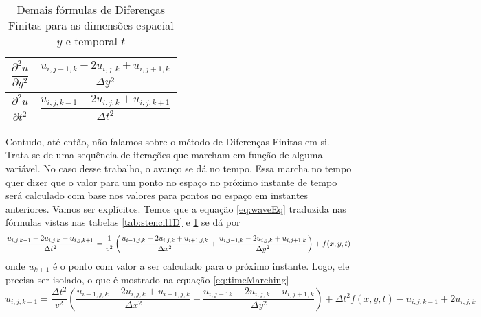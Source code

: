 	\begin{table}[H]
		\centering
		\caption{Demais fórmulas de Diferenças Finitas para as dimensões
			espacial $y$ e temporal $t$}
		\begin{tabular}{c|c}
			\hline
			$\dfrac{\partial^2 u}{\partial y^2}$ & $\dfrac{u_{i,j-1,k} - 2u_{i,j,k} + 
				u_{i,j+1,k}}{\Delta y^2}$ \\ \hline
			$\dfrac{\partial^2 u}{\partial t^2}$ & $\dfrac{u_{i,j,k-1} - 2u_{i,j,k} + 
				u_{i,j,k+1}}{\Delta t^2}$ \\ \hline
		\end{tabular}
		\label{tab:stencils3D}
	\end{table}
	
	
	Contudo, até então, não falamos sobre o método de Diferenças Finitas 
	em si. Trata-se de uma sequência de iterações que marcham em função de
	alguma variável. No caso desse trabalho, o avanço se dá no tempo. Essa marcha no tempo quer dizer que o valor para um ponto no espaço no próximo instante de tempo será calculado com base nos valores para pontos no espaço em instantes anteriores. Vamos ser explícitos. Temos que a equação \ref{eq:waveEq} traduzida nas fórmulas vistas nas tabelas 
	\ref{tab:stencil1D} e \ref{tab:stencils3D} se dá por
	\begin{equation}
		 \dfrac{u_{i,j,k-1} - 2u_{i,j,k} + u_{i,j,k+1}}{\Delta t^2} = \dfrac{1}{v^2}
			 \left(\dfrac{u_{i-1,j,k} - 2u_{i,j,k} + \\u_{i+1,j,k}}{\Delta x^2} + 
			 \dfrac{u_{i,j-1,k} - 2u_{i,j,k} + u_{i,j+1,k}}{\Delta y^2}\right) + f(x, y, t)
	\end{equation}
	onde $u_{k+1}$ é o ponto com valor a ser calculado para o próximo
	instante. Logo, ele precisa ser isolado, o que é mostrado na equação 
	\ref{eq:timeMarching}
	\begin{equation}
		\label{eq:timeMarching}
		u_{i, j,k+1} = \dfrac{\Delta t^2}{v^2}
		\left(\dfrac{u_{i-1,j,k} - 2u_{i,j,k} + u_{i+1,j,k}}{\Delta x^2} + 
		\dfrac{u_{i,j-1k} - 2u_{i,j,k} + u_{i,j+1,k}}{\Delta y^2}\right) + \Delta t^2f(x, y, t) - u_{i,j,k-1} + 2u_{i,j,k}
	\end{equation}
	
